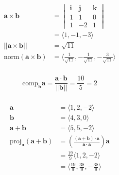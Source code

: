 \documentclass{article}
\begin{document}
\begin{align*}
  \mathbf{a} \times \mathbf{b}               & = \begin{vmatrix}
                                                   \mathbf{i} & \mathbf{j} & \mathbf{k} \\
                                                   1          & 1          & 0          \\
                                                   1          & -2         & 1
                                                 \end{vmatrix}                                            \\
                                             & = \langle 1, -1, -3 \rangle                                                       \\
  ||\mathbf{a} \times \mathbf{b}||           & = \sqrt{11}                                                                       \\
  \text{norm} (\mathbf{a} \times \mathbf{b}) & = \langle \frac{1}{\sqrt{11}}, -\frac{1}{\sqrt{11}}, -\frac{3}{\sqrt{11}} \rangle
\end{align*}

\setcounter{subsubsection}{32}
\subsubsection{}

\[\text{comp}_\mathbf{b} \mathbf{a} = \frac{\mathbf{a} \cdot \mathbf{b}}{||\mathbf{b}||} = \frac{10}{5} = 2\]

\setcounter{subsubsection}{34}
\subsubsection{}

\begin{align*}
  \mathbf{a}                                       & = \langle 1, 2, -2 \rangle                                                                                 \\
  \mathbf{b}                                       & = \langle 4, 3, 0 \rangle                                                                                  \\
  \mathbf{a} + \mathbf{b}                          & = \langle 5, 5, -2 \rangle                                                                                 \\
  \text{proj}_\mathbf{a} (\mathbf{a} + \mathbf{b}) & = \left( \frac{(\mathbf{a} + \mathbf{b}) \cdot \mathbf{a}}{\mathbf{a} \cdot \mathbf{a}} \right) \mathbf{a} \\
                                                   & = \frac{19}{9} \langle 1, 2, -2 \rangle                                                                    \\
                                                   & = \langle \frac{19}{9}, \frac{38}{9}, -\frac{38}{9} \rangle
\end{align*}
\end{document}
